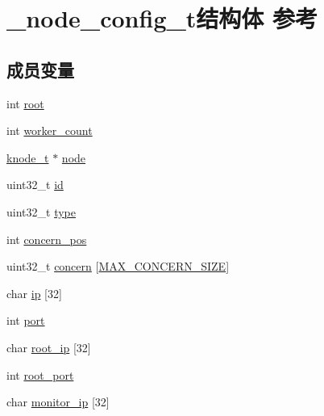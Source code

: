 \hypertarget{a00034}{}\section{\+\_\+node\+\_\+config\+\_\+t结构体 参考}
\label{a00034}
\subsection*{成员变量}
\begin{DoxyCompactItemize}
\item 
int \hyperlink{a00034_a322440df0544500fa597ed0709eba022_a322440df0544500fa597ed0709eba022}{root}
\item 
int \hyperlink{a00034_a7876f9ae03c9a187d39d655a30e3f3c5_a7876f9ae03c9a187d39d655a30e3f3c5}{worker\+\_\+count}
\item 
\hyperlink{a00066_a5e720b27efbc9ad744240f5f4233763a_a5e720b27efbc9ad744240f5f4233763a}{knode\+\_\+t} $\ast$ \hyperlink{a00034_a5a5cecc3f31fdbe8df38403b90e1d114_a5a5cecc3f31fdbe8df38403b90e1d114}{node}
\item 
uint32\+\_\+t \hyperlink{a00034_a680ba06c466674883438290e563e7366_a680ba06c466674883438290e563e7366}{id}
\item 
uint32\+\_\+t \hyperlink{a00034_ae6211c0e701b4dac1eb14e90be31d0cf_ae6211c0e701b4dac1eb14e90be31d0cf}{type}
\item 
int \hyperlink{a00034_acee10d2325f75b74a946dc9456b05a90_acee10d2325f75b74a946dc9456b05a90}{concern\+\_\+pos}
\item 
uint32\+\_\+t \hyperlink{a00034_a8103c5acc92e5950e449fcb9b69b4d9e_a8103c5acc92e5950e449fcb9b69b4d9e}{concern} \mbox{[}\hyperlink{a00104_af589e30e64a38f5efe59caad930a3f52_af589e30e64a38f5efe59caad930a3f52}{M\+A\+X\+\_\+\+C\+O\+N\+C\+E\+R\+N\+\_\+\+S\+I\+Z\+E}\mbox{]}
\item 
char \hyperlink{a00034_a6e4a1127730e98b1bf91e8fe76c0eab7_a6e4a1127730e98b1bf91e8fe76c0eab7}{ip} \mbox{[}32\mbox{]}
\item 
int \hyperlink{a00034_a57630762a3511890ad30c87cf7e780e4_a57630762a3511890ad30c87cf7e780e4}{port}
\item 
char \hyperlink{a00034_a5f2ebc188a7020dfef1167b4b7caebdb_a5f2ebc188a7020dfef1167b4b7caebdb}{root\+\_\+ip} \mbox{[}32\mbox{]}
\item 
int \hyperlink{a00034_a4fafc2daec45533af557d252c14cf754_a4fafc2daec45533af557d252c14cf754}{root\+\_\+port}
\item 
char \hyperlink{a00034_afee989ea34e334513995582058265220_afee989ea34e334513995582058265220}{monitor\+\_\+ip} \mbox{[}32\mbox{]}

\end{DoxyCompactItemize}

